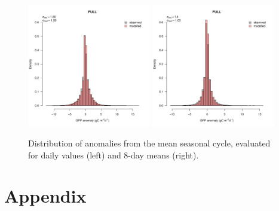 \documentclass{myreport}
\begin{document}
\begin{figure}[!ht]
    \centering
\includegraphics[width=0.48\textwidth]{fig/hist_anomalies_daily_FULL.pdf}
\includegraphics[width=0.48\textwidth]{fig/hist_anomalies_xdaily_FULL.pdf}
    \caption{Distribution of anomalies from the mean seasonal cycle, evaluated for daily values (left) and 8-day means (right).} 
    \label{fig:modobs_anomalies}
\end{figure}





\clearpage


\section{Appendix}
\end{document}
